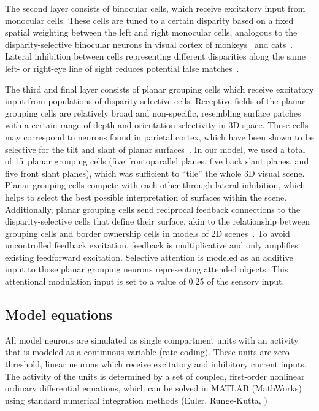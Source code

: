 The second layer consists of binocular cells, which receive excitatory
input from monocular cells. These cells are tuned to a certain disparity based on a fixed spatial weighting between the left and right monocular cells, analogous to the disparity-selective binocular neurons in visual cortex of monkeys~\citep{Poggio_Fischer77, Poggio_Poggio84} and cats~\citep{Bishop_Pettigrew86, Ohzawa_etal90}. Lateral inhibition between cells representing different disparities along the same left- or right-eye line of sight reduces potential false matches~\citep{Marr_Poggio76}.

The third and final layer consists of planar grouping cells which receive excitatory input from populations of disparity-selective
cells. Receptive fields of the planar grouping cells are relatively broad and non-specific, resembling surface patches with a certain range of depth and orientation selectivity in 3D space. These cells may correspond to neurons found in parietal cortex, which have been shown to be selective for the tilt and slant of planar surfaces~\citep{Rosenberg_etal13}. In our model, we used a total of 15~planar grouping cells (\ie five frontoparallel planes, five back slant planes, and five front slant planes), which was sufficient to ``tile'' the whole 3D visual scene. Planar grouping cells compete with each other through lateral inhibition, which helps to select the best possible interpretation of surfaces within the scene. Additionally, planar grouping cells send reciprocal feedback connections to the disparity-selective cells that define their surface, akin to the relationship between grouping cells and border ownership cells in models of 2D scenes~\citep{Craft_etal07,Mihalas_etal11b}. To avoid
uncontrolled feedback excitation, feedback is multiplicative and only amplifies existing feedforward excitation. Selective attention is modeled as an additive input to those planar grouping neurons representing attended objects. This attentional modulation input is set to a value of 0.25 of the sensory input.

\subsection{Model equations}

All model neurons are simulated as single compartment units with an
activity that is modeled as a continuous variable (rate coding). These
units are zero-threshold, linear neurons which receive excitatory and
inhibitory current inputs. The activity of the units is determined by
a set of coupled, first-order nonlinear ordinary differential equations, which can be solved in MATLAB (MathWorks) using standard numerical integration methods (Euler, Runge-Kutta, \etc) 

